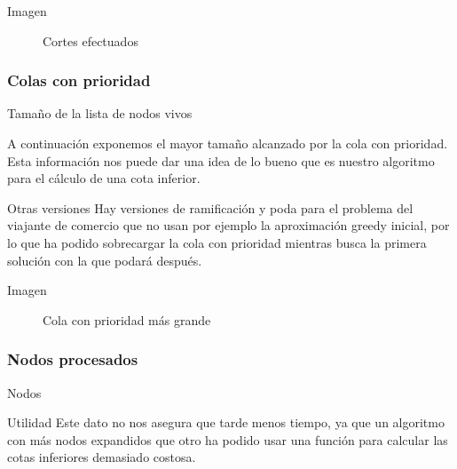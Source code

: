\begin{frame}
	\begin{exampleblock}{Imagen}
	\begin{figure}[H]
    		\centering
    		\caption{Cortes efectuados}
	\end{figure}
	\end{exampleblock}
\end{frame}


\subsubsection{Colas con prioridad}
\begin{frame}{Tamaño de la lista de nodos vivos}
	\begin{block}{ }
	A continuación exponemos el mayor tamaño alcanzado por la cola con prioridad.
	Esta información nos puede dar una idea de lo bueno que es nuestro algoritmo 
	para el cálculo de una cota inferior.
	\end{block}
	
	\begin{block}{Otras versiones}
	Hay versiones de ramificación y poda para el problema del viajante
	de comercio que no usan por ejemplo la aproximación greedy inicial, por lo que ha podido 
	sobrecargar la cola con prioridad mientras busca la primera solución con la que podará después.
	\end{block}
\end{frame}

\begin{frame}
	\begin{exampleblock}{Imagen}
	\begin{figure}[H]
    		\centering
    		\caption{Cola con prioridad más grande}
	\end{figure}
	\end{exampleblock}
\end{frame}


\subsubsection{Nodos procesados}
\begin{frame}{Nodos}
	\begin{block}{Utilidad}
	Este dato no nos asegura que tarde menos tiempo, ya que un algoritmo con más nodos 
	expandidos que otro ha podido usar una función para calcular las cotas inferiores demasiado costosa.
	\end{block}
\end{frame}

